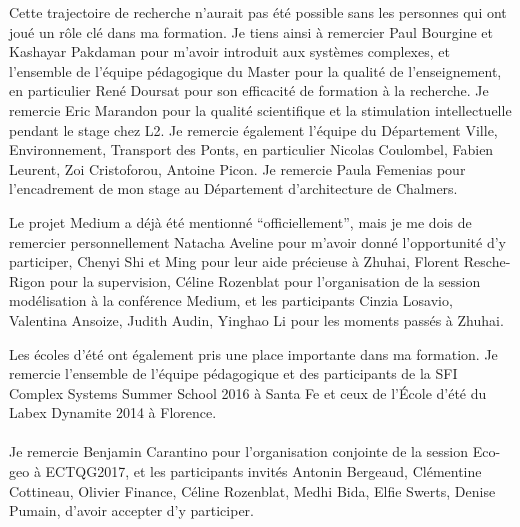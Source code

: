 Cette trajectoire de recherche n'aurait pas été possible sans les personnes qui ont joué un rôle clé dans ma formation. Je tiens ainsi à remercier Paul Bourgine et Kashayar Pakdaman pour m'avoir introduit aux systèmes complexes, et l'ensemble de l'équipe pédagogique du Master pour la qualité de l'enseignement, en particulier René Doursat pour son efficacité de formation à la recherche. Je remercie Eric Marandon pour la qualité scientifique et la stimulation intellectuelle pendant le stage chez L2. Je remercie également l'équipe du Département Ville, Environnement, Transport des Ponts, en particulier Nicolas Coulombel, Fabien Leurent, Zoi Cristoforou, Antoine Picon. Je remercie Paula Femenias pour l'encadrement de mon stage au Département d'architecture de Chalmers.

Le projet Medium a déjà été mentionné ``officiellement'', mais je me dois de remercier personnellement Natacha Aveline pour m'avoir donné l'opportunité d'y participer, Chenyi Shi et Ming pour leur aide précieuse à Zhuhai, Florent Resche-Rigon pour la supervision, Céline Rozenblat pour l'organisation de la session modélisation à la conférence Medium, et les participants Cinzia Losavio, Valentina Ansoize, Judith Audin, Yinghao Li pour les moments passés à Zhuhai.



Les écoles d'été ont également pris une place importante dans ma formation. Je remercie l'ensemble de l'équipe pédagogique et des participants de la SFI Complex Systems Summer School 2016 à Santa Fe et ceux de l'École d'été du Labex Dynamite 2014 à Florence.\\





\\


Je remercie Benjamin Carantino pour l'organisation conjointe de la session Eco-geo à ECTQG2017, et les participants invités Antonin Bergeaud, Clémentine Cottineau, Olivier Finance, Céline Rozenblat, Medhi Bida, Elfie Swerts, Denise Pumain, d'avoir accepter d'y participer.

